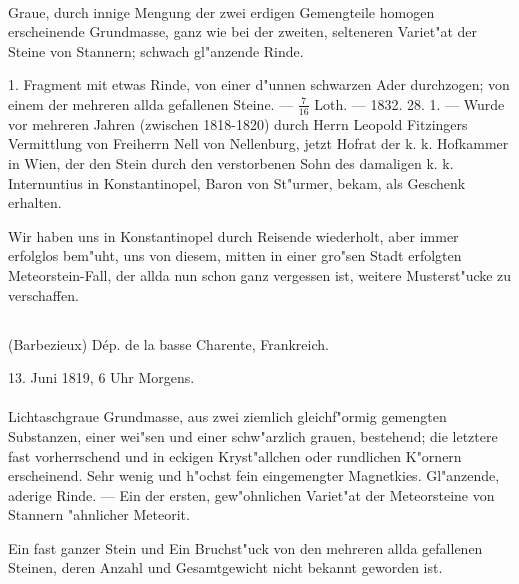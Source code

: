 \documentclass[a4paper, 11pt, oneside, polutonikogreek, german]{article}
\begin{document}
\paragraph{}
Graue, durch innige Mengung der zwei erdigen Gemengteile homogen erscheinende Grundmasse, ganz wie bei der zweiten, selteneren Variet"at der Steine von Stannern; schwach gl"anzende Rinde.

1. Fragment mit etwas Rinde, von einer d"unnen schwarzen Ader durchzogen; von einem der mehreren allda gefallenen Steine. --- $\mathfrak{\frac{7}{16}}$ Loth. --- 1832. 28. 1. --- Wurde vor mehreren Jahren (zwischen 1818-1820) durch Herrn Leopold Fitzingers Vermittlung von Freiherrn Nell von Nellenburg, jetzt Hofrat der k. k. Hofkammer in Wien, der den Stein durch den verstorbenen Sohn des damaligen k. k. Internuntius in Konstantinopel, Baron von St"urmer, bekam, als Geschenk erhalten.

\setlength{\leftskip}{10mm}
\setlength{\parindent}{0pt}

{\footnotesize Wir haben uns in Konstantinopel durch Reisende wiederholt, aber immer erfolglos bem"uht, uns von diesem, mitten in einer gro"sen Stadt erfolgten Meteorstein-Fall, der allda nun schon ganz vergessen ist, weitere Musterst"ucke zu verschaffen.}

\setlength{\leftskip}{0pt}
\setlength{\parindent}{20pt}

\subsection{}
\begin{center}

(Barbezieux) Dép. de la basse Charente, Frankreich.

13. Juni 1819, 6 Uhr Morgens.
\end{center}
\paragraph{}
Lichtaschgraue Grundmasse, aus zwei ziemlich gleichf"ormig gemengten Substanzen, einer wei"sen und einer schw"arzlich grauen, bestehend; die letztere fast vorherrschend und in eckigen Kryst"allchen oder rundlichen K"ornern erscheinend. Sehr wenig und h"ochst fein eingemengter Magnetkies. Gl"anzende, aderige Rinde. --- Ein der ersten, gew"ohnlichen Variet"at der Meteorsteine von Stannern "ahnlicher Meteorit.

Ein fast ganzer Stein und Ein Bruchst"uck von den mehreren allda gefallenen Steinen, deren Anzahl und Gesamtgewicht nicht bekannt geworden ist.
\end{document}
